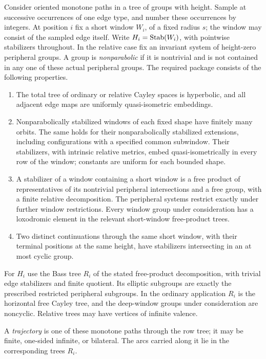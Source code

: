 \begin{definition}\label{gate:package}
Consider oriented monotone paths in a tree of groups with height.  Sample at
successive occurrences of one edge type, and number these occurrences by
integers.  At position $i$ fix a short window $W_i$, of a fixed radius $s$;
the window may consist of the sampled edge itself.  Write
$H_i=\operatorname{Stab}(W_i)$, with pointwise stabilizers throughout.  In the relative
case fix an invariant system of height-zero peripheral groups.  A group is
\emph{nonparabolic} if it is nontrivial and is not contained in any one of
these actual peripheral groups.  The required package consists of the
following properties.
\begin{enumerate}[label=(E\arabic*)]
\item The total tree of ordinary or relative Cayley spaces is hyperbolic,
and all adjacent edge maps are uniformly quasi-isometric embeddings.
\item Nonparabolically stabilized windows of each fixed shape have finitely
many orbits.  The same holds for their nonparabolically stabilized
extensions, including configurations with a specified common subwindow.
Their stabilizers, with intrinsic relative metrics, embed quasi-isometrically
in every row of the window; constants are uniform for each bounded shape.
\item A stabilizer of a window containing a short window is a free product
of representatives of its nontrivial peripheral intersections and a free
group, with a finite relative decomposition.  The peripheral systems
restrict exactly under further window restrictions.  Every window group
under consideration has a loxodromic element in the relevant short-window
free-product trees.
\item Two distinct continuations through the same short window, with their
terminal positions at the same height, have stabilizers intersecting in an
at most cyclic group.
\end{enumerate}
For $H_i$ use the Bass tree $R_i$ of the stated free-product decomposition,
with trivial edge stabilizers and finite quotient.  Its elliptic subgroups
are exactly the prescribed restricted peripheral subgroups.  In the ordinary
application $R_i$ is the horizontal free Cayley tree, and the deep-window
groups under consideration are noncyclic.  Relative trees may have vertices
of infinite valence.
\end{definition}

A \emph{trajectory} is one of these monotone paths through the row tree;
it may be finite, one-sided infinite, or bilateral. The arcs carried
along it lie in the corresponding trees $R_i$.

